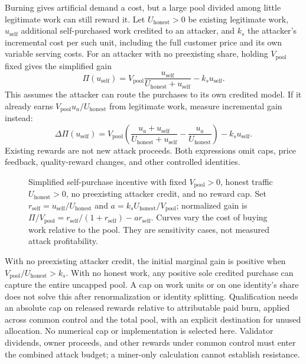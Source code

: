 Burning gives artificial demand a cost, but a large pool divided among little
legitimate work can still reward it. Let \(U_{\mathrm{honest}}>0\) be existing legitimate
work, \(u_{\mathrm{self}}\) additional self-purchased work credited to an attacker, and \(k_s\)
the attacker's incremental cost per such unit, including the full customer
price and its own variable serving costs. For an attacker with no preexisting
share, holding \(V_{\mathrm{pool}}\) fixed gives the simplified gain
\begin{equation}\label{eq:self-purchase-gain}
 \Pi(u_{\mathrm{self}})=V_{\mathrm{pool}}\frac{u_{\mathrm{self}}}{U_{\mathrm{honest}}+u_{\mathrm{self}}}-k_s u_{\mathrm{self}}.
\end{equation}
This assumes the attacker can route the purchases to its own credited model.
If it already earns \(V_{\mathrm{pool}} u_a/U_{\mathrm{honest}}\) from legitimate work, measure incremental
gain instead:
\[
 \Delta\Pi(u_{\mathrm{self}})=V_{\mathrm{pool}}\left(\frac{u_a+u_{\mathrm{self}}}{U_{\mathrm{honest}}+u_{\mathrm{self}}}-\frac{u_a}{U_{\mathrm{honest}}}\right)-k_s u_{\mathrm{self}}.
\]
Existing rewards are not new attack proceeds. Both expressions omit caps,
price feedback, quality-reward changes, and other controlled identities.

\begin{figure}[htbp]
\centering

\caption{Simplified self-purchase incentive with fixed \(V_{\mathrm{pool}}>0\), honest
traffic \(U_{\mathrm{honest}}>0\), no preexisting attacker credit, and no reward cap. Set
\(r_{\mathrm{self}}=u_{\mathrm{self}}/U_{\mathrm{honest}}\) and \(a=k_s U_{\mathrm{honest}}/V_{\mathrm{pool}}\); normalized gain is
\(\Pi/V_{\mathrm{pool}}=r_{\mathrm{self}}/(1+r_{\mathrm{self}})-a r_{\mathrm{self}}\). Curves vary the cost of buying work relative to the
pool. They are sensitivity cases, not measured attack profitability.}
\label{fig:self-purchase-sensitivity}
\end{figure}

With no preexisting attacker credit, the initial marginal gain is positive
when \(V_{\mathrm{pool}}/U_{\mathrm{honest}}>k_s\). With no honest
work, any positive sole credited purchase can capture the entire uncapped
pool. A cap on work units or on one identity's share does not solve this after
renormalization or identity splitting. Qualification needs an absolute cap on
released rewards relative to attributable paid burn, applied across common
control and the total pool, with an explicit destination for unused allocation.
No numerical cap or implementation is selected here. Validator dividends,
owner proceeds, and other rewards under common control must enter the combined
attack budget; a miner-only calculation cannot establish resistance.

